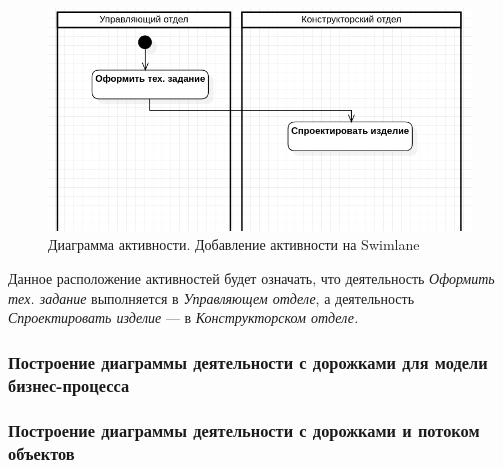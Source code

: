 \documentclass[a4paper,12pt]{report}
\begin{document}
\begin{figure}[h!]
	\centering
	\includegraphics[width=0.7\linewidth]{images/activityactivityonlane}
	\caption{Диаграмма активности. Добавление активности на Swimlane}
	\label{fig:activityactivityonlane}
\end{figure}


Данное расположение активностей будет означать, что деятельность \textit{Оформить тех. задание} выполняется в \textit{Управляющем отделе}, а деятельность \textit{Спроектировать изделие} --- в \textit{Конструкторском отделе.}
\subsubsection*{Построение диаграммы деятельности с дорожками для модели бизнес-процесса}

\subsubsection*{Построение диаграммы деятельности с дорожками и потоком объектов}

\newpage
{}
\listoffigures
\newpage
{}
\listoftables
\end{document}
